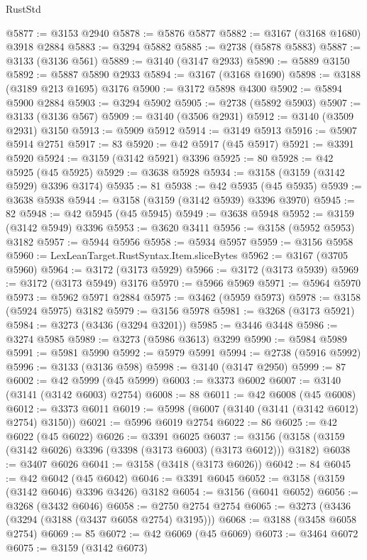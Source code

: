\begin{lexlean}{RustStd}
\begin{coremodule}
@5877 := @3153 @2940
@5878 := @5876 @5877
@5882 := @3167 (@3168 @1680) @3918 @2884
@5883 := @3294 @5882
@5885 := @2738 (@5878 @5883)
@5887 := @3133 (@3136 @561)
@5889 := @3140 (@3147 @2933)
@5890 := @5889 @3150
@5892 := @5887 @5890 @2933
@5894 := @3167 (@3168 @1690)
@5898 := @3188 (@3189 @213 @1695) @3176
@5900 := @3172 @5898 @4300
@5902 := @5894 @5900 @2884
@5903 := @3294 @5902
@5905 := @2738 (@5892 @5903)
@5907 := @3133 (@3136 @567)
@5909 := @3140 (@3506 @2931)
@5912 := @3140 (@3509 @2931) @3150
@5913 := @5909 @5912
@5914 := @3149 @5913
@5916 := @5907 @5914 @2751
@5917 := 83
@5920 := @42 @5917 (@45 @5917)
@5921 := @3391 @5920
@5924 := @3159 (@3142 @5921) @3396
@5925 := 80
@5928 := @42 @5925 (@45 @5925)
@5929 := @3638 @5928
@5934 := @3158 (@3159 (@3142 @5929) @3396 @3174)
@5935 := 81
@5938 := @42 @5935 (@45 @5935)
@5939 := @3638 @5938
@5944 := @3158 (@3159 (@3142 @5939) @3396 @3970)
@5945 := 82
@5948 := @42 @5945 (@45 @5945)
@5949 := @3638 @5948
@5952 := @3159 (@3142 @5949) @3396
@5953 := @3620 @3411
@5956 := @3158 (@5952 @5953) @3182
@5957 := @5944 @5956
@5958 := @5934 @5957
@5959 := @3156 @5958
@5960 := LexLeanTarget.RustSyntax.Item.sliceBytes
@5962 := @3167 (@3705 @5960)
@5964 := @3172 (@3173 @5929)
@5966 := @3172 (@3173 @5939)
@5969 := @3172 (@3173 @5949) @3176
@5970 := @5966 @5969
@5971 := @5964 @5970
@5973 := @5962 @5971 @2884
@5975 := @3462 (@5959 @5973)
@5978 := @3158 (@5924 @5975) @3182
@5979 := @3156 @5978
@5981 := @3268 (@3173 @5921)
@5984 := @3273 (@3436 (@3294 @3201))
@5985 := @3446 @3448
@5986 := @3274 @5985
@5989 := @3273 (@5986 @3613) @3299
@5990 := @5984 @5989
@5991 := @5981 @5990
@5992 := @5979 @5991
@5994 := @2738 (@5916 @5992)
@5996 := @3133 (@3136 @598)
@5998 := @3140 (@3147 @2950)
@5999 := 87
@6002 := @42 @5999 (@45 @5999)
@6003 := @3373 @6002
@6007 := @3140 (@3141 (@3142 @6003) @2754)
@6008 := 88
@6011 := @42 @6008 (@45 @6008)
@6012 := @3373 @6011
@6019 := @5998 (@6007 (@3140 (@3141 (@3142 @6012) @2754) @3150))
@6021 := @5996 @6019 @2754
@6022 := 86
@6025 := @42 @6022 (@45 @6022)
@6026 := @3391 @6025
@6037 := @3156 (@3158 (@3159 (@3142 @6026) @3396 (@3398 (@3173 @6003) (@3173 @6012))) @3182)
@6038 := @3407 @6026
@6041 := @3158 (@3418 (@3173 @6026))
@6042 := 84
@6045 := @42 @6042 (@45 @6042)
@6046 := @3391 @6045
@6052 := @3158 (@3159 (@3142 @6046) @3396 @3426) @3182
@6054 := @3156 (@6041 @6052)
@6056 := @3268 (@3432 @6046)
@6058 := @2750 @2754 @2754
@6065 := @3273 (@3436 (@3294 (@3188 (@3437 @6058 @2754) @3195)))
@6068 := @3188 (@3458 @6058 @2754)
@6069 := 85
@6072 := @42 @6069 (@45 @6069)
@6073 := @3464 @6072
@6075 := @3159 (@3142 @6073)

\end{coremodule}
\end{lexlean}
